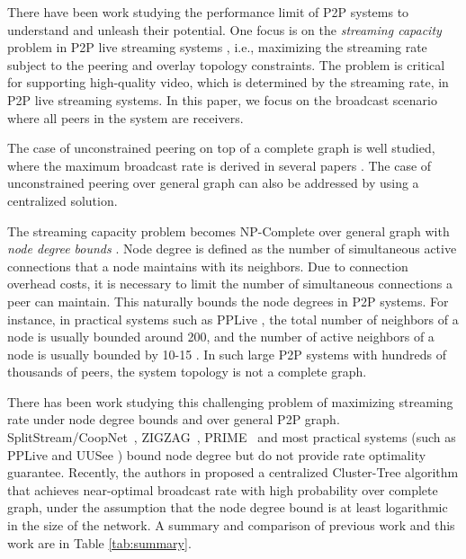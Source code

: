 \documentclass[10pt,conference]{IEEEtran}
\begin{document}
There have been work studying the performance limit of P2P systems
to understand and unleash their potential. One focus is on the \emph{streaming
capacity} problem \cite{streaming_capacity.allerton09} in P2P live streaming systems
, i.e., maximizing the streaming rate subject to the peering and overlay topology constraints.
The problem is critical for supporting high-quality video, which is
determined by the streaming rate, in P2P live streaming systems. In this paper, we
focus on the broadcast scenario where all peers in the system are
receivers.

The case of unconstrained peering on top of a complete graph is well
studied, where the maximum broadcast rate is derived in several papers
\cite{all:P2PStreaming:KLR.07,all:Mutualcast:LPZ05,all:NetCodP2P:CYHF.06,massoulie2007rdb,chen2008ump}.
The case of unconstrained peering over general graph can also be addressed
by using a centralized solution\cite{sudipta2009lcclc}.

The streaming capacity problem becomes NP-Complete over general graph
with \emph{node degree bounds} \cite{streaming_capacity.icdcs10}.
Node degree is defined as the number of simultaneous active connections that a node maintains with its neighbors. Due to connection overhead costs, it is necessary
to limit the number of simultaneous connections a peer can maintain.
This naturally bounds the node degrees in P2P systems. For instance, in practical
systems such as PPLive \cite{all:pplive}, the total number of neighbors of
a node is usually bounded around 200, and the number
of active neighbors of a node is usually bounded by 10-15 \cite{streaming_capacity.allerton09}. In such large P2P systems with hundreds of thousands of peers, the system topology is not a complete graph.

There has been work studying this challenging problem of maximizing streaming rate under node degree bounds and over general P2P graph. SplitStream/CoopNet~\cite{castro2003shb,padmanabhan2002ccn},
ZIGZAG~\cite{zigzag}, PRIME~\cite{magharei2009prime} and most
practical systems (such as PPLive \cite{all:pplive} and UUSee \cite{all:uusee})
bound node degree but do not provide rate optimality guarantee. Recently,
the authors in \cite{streaming_capacity.icdcs10} proposed a centralized
Cluster-Tree algorithm that achieves near-optimal broadcast rate with
high probability over complete graph, under the assumption that the
node degree bound is at least logarithmic in the size of the network. A summary
and comparison of previous work and this work are in Table \ref{tab:summary}.
\end{document}
